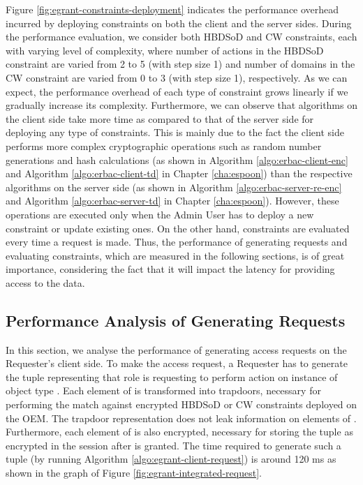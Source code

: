\documentclass[epsfig,a4paper,11pt,titlepage]{book}
\numberwithin{algorithm}{chapter}
\begin{document}
Figure \ref{fig:egrant-constraints-deployment} indicates the performance overhead incurred by deploying constraints on both the client and the server sides. During the performance evaluation, we consider both \gls{HBDSoD} and \gls{CW} constraints, each with varying level of complexity, where number of actions in the \gls{HBDSoD} constraint are varied from 2 to 5 (with step size 1) and number of domains in the \gls{CW} constraint are varied from 0 to 3 (with step size 1), respectively. As we can expect, the performance overhead of each type of constraint grows linearly if we gradually increase its complexity. Furthermore, we can observe that algorithms on the client side take more time as compared to that of the server side for deploying any type of constraints. This is mainly due to the fact the client side performs more complex cryptographic operations such as random number generations and hash calculations (as shown in Algorithm \ref{algo:erbac-client-enc} and Algorithm \ref{algo:erbac-client-td} in Chapter \ref{cha:espoon}) than the respective algorithms on the server side (as shown in Algorithm \ref{algo:erbac-server-re-enc} and Algorithm \ref{algo:erbac-server-td} in Chapter \ref{cha:espoon}). However, these operations are executed only when the Admin User has to deploy a new constraint or update existing ones. On the other hand, constraints are evaluated every time a request is made. Thus, the performance of generating requests and evaluating constraints, which are measured in the following sections, is of great importance, considering the fact that it will impact the latency for providing access to the data.


\subsection{Performance Analysis of Generating Requests}

In this section, we analyse the performance of generating access requests on the Requester's client side. To make the access request, a Requester has to generate the  tuple representing that role  is requesting to perform action  on instance  of object type . Each element of  is transformed into trapdoors, necessary for performing the match against encrypted \gls{HBDSoD} or \gls{CW} constraints deployed on the \gls{OEM}. The trapdoor representation does not leak information on elements of . Furthermore, each element of  is also encrypted, necessary for storing the  tuple as encrypted in the session after  is granted. The time required to generate such a tuple (by running Algorithm \ref{algo:egrant-client-request}) is around 120 \gls{ms} as shown in the graph of Figure \ref{fig:egrant-integrated-request}.
\end{document}
